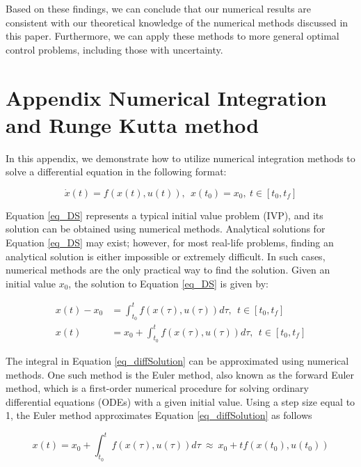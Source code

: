 \documentclass  [
  paper    = a4,
  BCOR     = 10mm,
  twoside,
  fontsize = 12pt,
  fleqn,
  toc      = bibnumbered,
  toc      = listofnumbered,
  numbers  = noendperiod,
  headings = normal,
  listof   = leveldown,
  version  = 3.03
]                                       {scrreprt}
\newcommand{\<}{\langle}
\renewcommand{\>}{\rangle}
\begin{document}
Based on these findings, we can conclude that our numerical results are consistent with our theoretical knowledge of the numerical methods discussed in this paper. Furthermore, we can apply these methods to more general optimal control problems, including those with uncertainty.

\appendix
\chapter{Appendix  Numerical Integration and Runge Kutta method}
 \label{App1}
  	
In this appendix, we demonstrate how to utilize numerical integration methods to solve a differential equation in the following format:

\begin{equation}
	\dot{x}(t) = f(x(t), u(t)), \ \ x(t_0) = x_0, \ t \in [t_0, t_f]
	\label{eq_DS}
\end{equation}

Equation \ref{eq_DS} represents a typical initial value problem (IVP), and its solution can be obtained using numerical methods. Analytical solutions for Equation \ref{eq_DS} may exist; however, for most real-life problems, finding an analytical solution is either impossible or extremely difficult. In such cases, numerical methods are the only practical way to find the solution. Given an initial value $x_0$, the solution to Equation \ref{eq_DS} is given by:

\begin{equation}\label{eq_diffSolution}
	\begin{aligned}
		x(t) - x_0 &= \int_{t_0}^{t} f(x(\tau), u(\tau)) d \tau, \ \ t \in [t_0, t_f] \\
		x(t) & = x_0 + \int_{t_0}^{t} f(x(\tau), u(\tau)) d \tau, \ \ t \in [t_0, t_f]
	\end{aligned}
\end{equation}

The integral in Equation \ref{eq_diffSolution} can be approximated using numerical methods. One such method is the Euler method, also known as the forward Euler method, which is a first-order numerical procedure for solving ordinary differential equations (ODEs) with a given initial value. Using a step size equal to 1, the Euler method approximates Equation \ref{eq_diffSolution} as follows

\begin{equation}
  	x(t)  = x_0  + \int_{t_0}^{t}  f(x(\tau), u(\tau)) d \tau \ \approx \   x_0  + t f(x(t_0), u(t_0))
  	\label{eq_Euler_approx}
\end{equation}
  	
\end{document}
